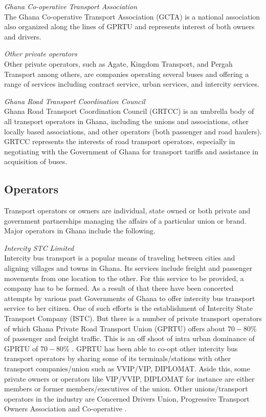 \textit{Ghana Co-operative Transport Association}\\
The Ghana Co-operative Transport Association (GCTA) is a national association also organized along the lines of GPRTU and represents interest of both owners and drivers.

\textit{Other private operators}\\
Other private operators, such as Agate, Kingdom Transport, and Pergah Transport among others, are companies operating several buses and offering a range of services including contract service, urban services, and intercity services.

\textit{Ghana Road Transport Coordination Council}\\
Ghana Road Transport Coordination Council (GRTCC) is an umbrella body of all transport operators in Ghana, including the unions and associations, other locally based associations, and other operators (both passenger and road haulers). GRTCC represents the interests of road transport operators, especially in negotiating with the Government of Ghana for transport tariffs and assistance in acquisition of buses.

\subsection{Operators}
Transport operators or owners are individual, state owned or both private and government partnerships managing the affairs of a particular union or brand. Major operators in Ghana include the following.

\textit{Intercity STC Limited}\\
Intercity bus transport is a popular means of traveling between cities and aligning villages and towns in Ghana. Its services include freight and passenger movements from one location to the other. For this service to be provided, a company has to be formed. As a result of that there have been concerted attempts by various past Governments of Ghana to offer intercity bus transport service to her citizen. One of such efforts is the establishment of Intercity State Transport Company (ISTC). But there is a number of private transport operators 
of which Ghana Private Road Transport Union (GPRTU) offers about $70-80\%$ of passenger and freight traffic. This is an off shoot of intra urban dominance of GPRTU of $70-80\%$ \citep{abane2011travel}. GPRTU has been able to co-opt other intercity bus transport operators by sharing some of its terminals/stations with other transport 
companies/union such as VVIP/VIP, DIPLOMAT. Aside this, some private owners or operators like VIP/VVIP, DIPLOMAT for instance are either members or former members/executives of the union. Other unions/transport operators in the industry are Concerned Drivers Union, Progressive Transport Owners Association and Co-operative \citep{ojobus}.

